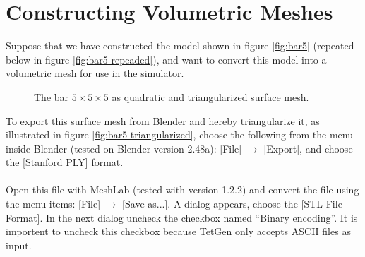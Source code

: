 
\chapter{Constructing Volumetric Meshes}
\label{sec:constructing-meshes}
Suppose that we have constructed the model shown in figure \vref{fig:bar5}
(repeated below in figure \ref{fig:bar5-repeaded}), and want to
convert this model into a volumetric mesh for use in the simulator.

\begin{figure}
  \centering
  \caption{The bar $5 \times 5 \times 5$ as quadratic and triangularized
    surface mesh.}
  \label{fig:bar}
\end{figure}

To export this surface mesh from Blender and hereby triangularize it,
as illustrated in figure \vref{fig:bar5-triangularized}, choose the
following from the menu inside Blender (tested on Blender version 2.48a):
[File] $\rightarrow$ [Export], and choose the [Stanford PLY] format. \\

 \\

Open this file with MeshLab (tested with version 1.2.2) and convert
the file using the menu items: [File] $\rightarrow$ [Save as...]. A
dialog appears, choose the [STL File Format]. In the next dialog
uncheck the checkbox named ``Binary encoding''. It is importent to
uncheck this checkbox because TetGen only accepts ASCII files as input. \\

